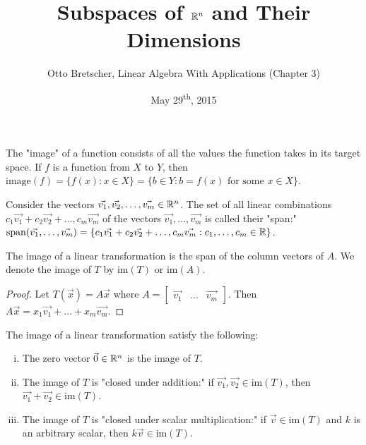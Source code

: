 \documentclass[a4paper,11pt]{article}
\title{Subspaces of \(\mathbb{R}^n\) and Their Dimensions}
\author{Otto Bretscher, Linear Algebra With Applications (Chapter 3)}
\date{May 29\textsuperscript{th}, 2015}
\begin{document}
\maketitle
{}

\begin{outline}

    The "image" of a function consists of all the values the function takes in its target space. If \(f\) is a function
    from \(X\) to \(Y\), then \(\text{image}(f) = \{f(x): x \in X\} = \{ b \in Y : b = f(x) \text{ for some } x \in X\}\).
    
    Consider the vectors \(\vec{v_1}, \vec{v_2}, \ldots, \vec{v_m} \in \mathbb{R}^n\). The set of all linear 
    combinations \(c_1\vec{v_1} + c_2\vec{v_2} + \ldots, c_m\vec{v_m}\) of the vectors \(\vec{v_1}, \ldots,
    \vec{v_m}\) is called their "span:" \(\text{span}(\vec{v_1}, \ldots, \vec{v_m}) = \{c_1\vec{v_1} + 
    c_2\vec{v_2} + \ldots, c_m\vec{v_m} : c_1, \ldots, c_m \in \mathbb{R}\}\).
    
    The image of a linear transformation is the span of the column vectors of \(A\). We denote the image of \(T\)
    by \(\text{im}(T)\) or \(\text{im}(A)\).
    
    \begin{proof}
      Let \(T(\vec{x}) = A\vec{x}\) where \(A = \begin{bmatrix} \vec{v_1} & \ldots & \vec{v_m} \end{bmatrix}\). Then
      \(A\vec{x} = x_1\vec{v_1} + \ldots + x_m\vec{v_m}\).
    \end{proof}
    
    The image of a linear transformation satisfy the following:
    \begin{enumerate}[i.]
      \item 
        The zero vector \(\vec{0} \in \mathbb{R}^n\) is the image of \(T\).
      \item 
        The image of \(T\) is "closed under addition:" if \(\vec{v_1}, \vec{v_2} \in \text{im}(T)\), then
        \(\vec{v_1} + \vec{v_2} \in \text{im}(T)\).
      \item
        The image of \(T\) is "closed under scalar multiplication:" if \(\vec{v} \in \text{im}(T)\) and \(k\)
        is an arbitrary scalar, then \(k\vec{v} \in \text{im}(T)\).
    \end{enumerate}
    

\end{outline}
\end{document}
